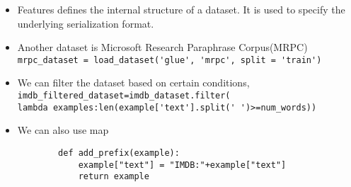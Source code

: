 \documentclass[a4paper]{article}
\begin{document}
\begin{itemize}
    \item Features defines the internal structure of a dataset. It is used to specify the underlying serialization format.
    \item Another dataset is Microsoft Research Paraphrase Corpus(MRPC)\\
    \verb|mrpc_dataset = load_dataset('glue', 'mrpc', split = 'train')|
    \item We can filter the dataset based on certain conditions,\\
    \verb|imdb_filtered_dataset=imdb_dataset.filter(|\\
    \verb|lambda examples:len(example['text'].split(' ')>=num_words))|
    \item We can also use map
    \vspace{-1mm}
    \begin{verbatim}
        def add_prefix(example):
            example["text"] = "IMDB:"+example["text"]
            return example


\end{verbatim}
\end{itemize}
\end{document}
